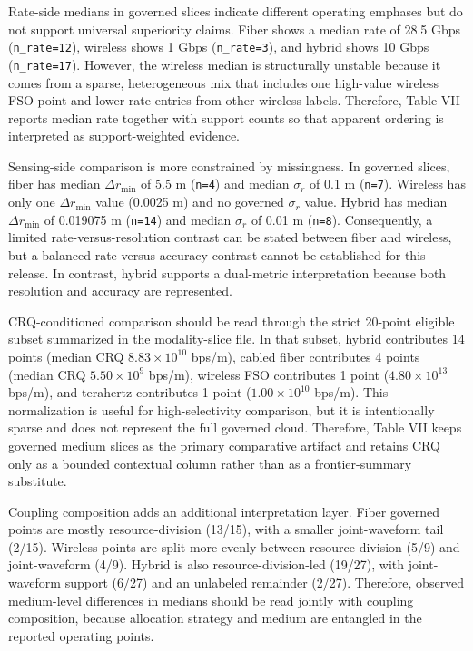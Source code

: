 Rate-side medians in governed slices indicate different operating emphases but do not support universal superiority claims. Fiber shows a median rate of 28.5 Gbps (\texttt{n\_rate=12}), wireless shows 1 Gbps (\texttt{n\_rate=3}), and hybrid shows 10 Gbps (\texttt{n\_rate=17}). However, the wireless median is structurally unstable because it comes from a sparse, heterogeneous mix that includes one high-value wireless FSO point and lower-rate entries from other wireless labels. Therefore, Table VII reports median rate together with support counts so that apparent ordering is interpreted as support-weighted evidence.

Sensing-side comparison is more constrained by missingness. In governed slices, fiber has median $\Delta r_{\min}$ of 5.5 m (\texttt{n=4}) and median $\sigma_r$ of 0.1 m (\texttt{n=7}). Wireless has only one $\Delta r_{\min}$ value (0.0025 m) and no governed $\sigma_r$ value. Hybrid has median $\Delta r_{\min}$ of 0.019075 m (\texttt{n=14}) and median $\sigma_r$ of 0.01 m (\texttt{n=8}). Consequently, a limited rate-versus-resolution contrast can be stated between fiber and wireless, but a balanced rate-versus-accuracy contrast cannot be established for this release. In contrast, hybrid supports a dual-metric interpretation because both resolution and accuracy are represented.

CRQ-conditioned comparison should be read through the strict 20-point eligible subset summarized in the modality-slice file. In that subset, hybrid contributes 14 points (median CRQ $8.83 \times 10^{10}$ bps/m), cabled fiber contributes 4 points (median CRQ $5.50 \times 10^9$ bps/m), wireless FSO contributes 1 point ($4.80 \times 10^{13}$ bps/m), and terahertz contributes 1 point ($1.00 \times 10^{10}$ bps/m). This normalization is useful for high-selectivity comparison, but it is intentionally sparse and does not represent the full governed cloud. Therefore, Table VII keeps governed medium slices as the primary comparative artifact and retains CRQ only as a bounded contextual column rather than as a frontier-summary substitute.

Coupling composition adds an additional interpretation layer. Fiber governed points are mostly resource-division (13/15), with a smaller joint-waveform tail (2/15). Wireless points are split more evenly between resource-division (5/9) and joint-waveform (4/9). Hybrid is also resource-division-led (19/27), with joint-waveform support (6/27) and an unlabeled remainder (2/27). Therefore, observed medium-level differences in medians should be read jointly with coupling composition, because allocation strategy and medium are entangled in the reported operating points.

